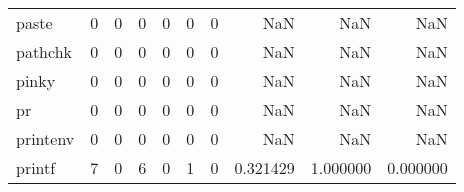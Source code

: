 \begin{longtable}{lrrrrrrrrr}
paste     &                                                  0 &                                                  0 &                                                  0 &                                                  0 &                                                  0 &                                                  0 &                                                NaN &                                    NaN &                                  NaN \\
pathchk   &                                                  0 &                                                  0 &                                                  0 &                                                  0 &                                                  0 &                                                  0 &                                                NaN &                                    NaN &                                  NaN \\
pinky     &                                                  0 &                                                  0 &                                                  0 &                                                  0 &                                                  0 &                                                  0 &                                                NaN &                                    NaN &                                  NaN \\
pr        &                                                  0 &                                                  0 &                                                  0 &                                                  0 &                                                  0 &                                                  0 &                                                NaN &                                    NaN &                                  NaN \\
printenv  &                                                  0 &                                                  0 &                                                  0 &                                                  0 &                                                  0 &                                                  0 &                                                NaN &                                    NaN &                                  NaN \\
printf    &                                                  7 &                                                  0 &                                                  6 &                                                  0 &                                                  1 &                                                  0 &                                           0.321429 &                               1.000000 &                             0.000000 \\

\end{longtable}
